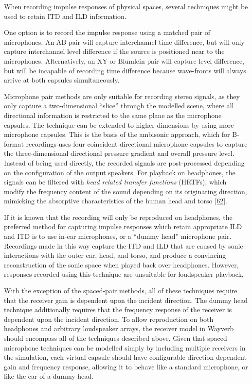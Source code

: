 \documentclass[]{scrreprt}
\begin{document}
When recording impulse responses of physical spaces, several techniques
might be used to retain ITD and ILD information.

One option is to record the impulse response using a matched pair of
microphones. An AB pair will capture interchannel time difference, but
will only capture interchannel level difference if the source is
positioned near to the microphones. Alternatively, an XY or Blumlein
pair will capture level difference, but will be incapable of recording
time difference because wave-fronts will always arrive at both capsules
simultaneously.

Microphone pair methods are only suitable for recording stereo signals,
as they only capture a two-dimensional ``slice'' through the modelled
scene, where all directional information is restricted to the same plane
as the microphone capsules. The technique can be extended to higher
dimensions by using more microphone capsules. This is the basis of the
ambisonic approach, which for B-format recordings uses four coincident
directional microphone capsules to capture the three-dimensional
directional pressure gradient and overall pressure level. Instead of
being used directly, the recorded signals are post-processed depending
on the configuration of the output speakers. For playback on headphones,
the signals can be filtered with \emph{head related transfer functions}
(HRTFs), which modify the frequency content of the sound depending on
its originating direction, mimicking the absorptive characteristics of
the human head and torso
{[}\protect\hyperlink{ref-noisternigux5f3dux5f2003}{62}{]}.

If it is known that the recording will only be reproduced on headphones,
the preferred method for capturing impulse responses which retain
appropriate ILD and ITD is to use in-ear microphones, or a ``dummy
head'' microphone pair. Recordings made in this way capture the ITD and
ILD that are caused by sonic interactions with the outer ear, head, and
torso, and produce a convincing reconstruction of the sonic space when
played back over headphones. However, responses recorded using this
technique are unsuitable for loudspeaker playback.

With the exception of the spaced-pair methods, all of these techniques
require that the receiver gain is dependent upon the incident direction.
The dummy head technique additionally requires that the frequency
response of the receiver is dependent upon the incident direction. To
allow reproduction on both headphones and arbitrary loudspeaker arrays,
the receiver model in Wayverb should encompass all of the techniques
described above. Given that spaced microphone techniques can be modelled
simply by including multiple receivers in the simulation, each virtual
capsule should have configurable direction-dependent gain and frequency
response, allowing it to behave like a standard microphone, or like the
ear of a dummy head.
\end{document}

